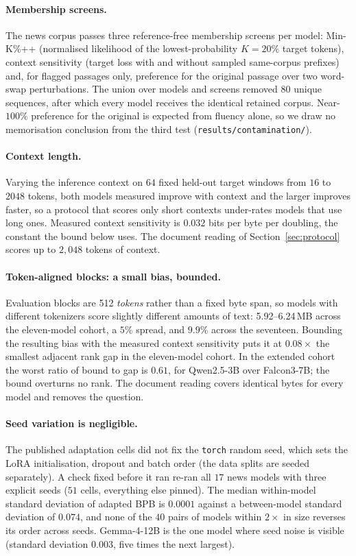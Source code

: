 \documentclass[10pt]{article}
\begin{document}
\paragraph{Membership screens.} The news corpus passes three reference-free membership screens per
model: Min-K\%++ (normalised likelihood of the lowest-probability $K{=}20\%$ target tokens),
context sensitivity (target loss with and without sampled same-corpus prefixes) and, for flagged
passages only, preference for the original passage over two word-swap perturbations. The union over
models and screens removed $80$ unique sequences, after which every model receives the identical
retained corpus. Near-$100\%$ preference for the original is expected from fluency alone, so we draw
no memorisation conclusion from the third test (\texttt{results/contamination/}).

\paragraph{Context length.} Varying the inference context on $64$ fixed held-out target windows from
$16$ to $2048$ tokens, both models measured improve with context and the larger improves faster, so
a protocol that scores only short contexts under-rates models that use long ones. Measured context
sensitivity is $0.032$ bits per byte per doubling, the constant the bound below uses. The document
reading of Section~\ref{sec:protocol} scores up to $2{,}048$ tokens of context.

\paragraph{Token-aligned blocks: a small bias, bounded.} Evaluation blocks are 512 \emph{tokens}
rather than a fixed byte span, so models with different tokenizers score slightly different amounts
of text: 5.92--6.24\,MB across the eleven-model cohort, a $5\%$ spread, and $9.9\%$ across the
seventeen. Bounding the resulting bias with the measured context sensitivity puts it at $0.08\times$
the smallest adjacent rank gap in the eleven-model cohort. In the extended cohort the worst ratio of
bound to gap is $0.61$, for Qwen2.5-3B over Falcon3-7B; the bound overturns no rank. The document
reading covers identical bytes for every model and removes the question.

\paragraph{Seed variation is negligible.} The published adaptation cells did not fix the \texttt{torch} random
seed, which sets the LoRA initialisation, dropout and batch order (the data splits are seeded
separately). A check fixed before it ran re-ran all $17$ news models with three explicit seeds ($51$
cells, everything else pinned). The median within-model standard deviation of adapted BPB is
$0.0001$ against a between-model standard deviation of $0.074$, and none of the $40$ pairs of models
within $2\times$ in size reverses its order across seeds. Gemma-4-12B is the one model where seed
noise is visible (standard deviation $0.003$, five times the next largest).
\end{document}
